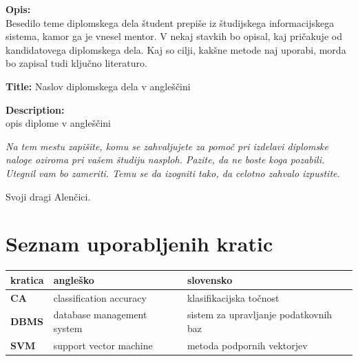 \documentclass[a4paper,12pt,openright]{book}
\newcommand{\clearemptydoublepage}{\newpage{\pagestyle{empty}\cleardoublepage}}
\begin{document}
\bigskip
\noindent\textbf{Opis:}\\
Besedilo teme diplomskega dela študent prepiše iz študijskega informacijskega sistema, kamor ga je vnesel mentor.
V nekaj stavkih bo opisal, kaj pričakuje od kandidatovega diplomskega dela.
Kaj so cilji, kakšne metode naj uporabi, morda bo zapisal tudi ključno literaturo.

\bigskip
\noindent\textbf{Title:} Naslov diplomskega dela v angleščini

\bigskip
\noindent\textbf{Description:}\\
opis diplome v angleščini

\vfill



\vspace{2cm}

\clearemptydoublepage

\thispagestyle{empty}\mbox{}\vfill\null\it%
\noindent
Na tem mestu zapišite, komu se zahvaljujete za pomoč pri izdelavi diplomske naloge oziroma pri vašem študiju nasploh. Pazite, da ne boste koga pozabili. Utegnil vam bo zameriti. Temu se da izogniti tako, da celotno zahvalo izpustite.
\rm\normalfont

\clearemptydoublepage

\thispagestyle{empty}\mbox{}{\textheight}\mbox{}\hfill\begin{minipage}{0.55\textwidth}%
	Svoji dragi Alenčici.
	\normalfont\end{minipage}

\clearemptydoublepage


\pagestyle{empty}
\def\thepage{}%
\tableofcontents{}


\clearemptydoublepage


\chapter*{Seznam uporabljenih kratic}

\noindent\begin{tabular}{p{}|p{}|p{}}    %
	{\bf kratica} & {\bf angleško}             & {\bf slovensko}                       \\ \hline
	{\bf CA}      & classification accuracy    & klasifikacijska točnost               \\
	{\bf DBMS}    & database management system & sistem za upravljanje podatkovnih baz \\
	{\bf SVM}     & support vector machine     & metoda podpornih vektorjev            \\
\end{tabular}
\end{document}
